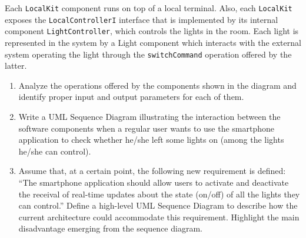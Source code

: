 Each \texttt{LocalKit} component runs on top of a local terminal. 
Also, each \texttt{LocalKit} exposes the \texttt{LocalControllerI} interface that is implemented by its internal component \texttt{LightController}, which controls the lights in the room. 
Each light is represented in the system by a Light component which interacts with the external system operating the light through the \texttt{switchCommand} operation offered by the latter.
\begin{enumerate}
    \item Analyze the operations offered by the components shown in the diagram and identify proper input and output parameters for each of them.
    \item Write a UML Sequence Diagram illustrating the interaction between the software components when a regular user wants to use the smartphone application to check whether he/she left some lights on (among the lights he/she can control).
    \item Assume that, at a certain point, the following new requirement is defined:
        “The smartphone application should allow users to activate and deactivate the receival of real-time updates about the state (on/off) of all the lights they can control.”
        Define a high-level UML Sequence Diagram to describe how the current architecture could accommodate this requirement.
        Highlight the main disadvantage emerging from the sequence diagram.
\end{enumerate}

